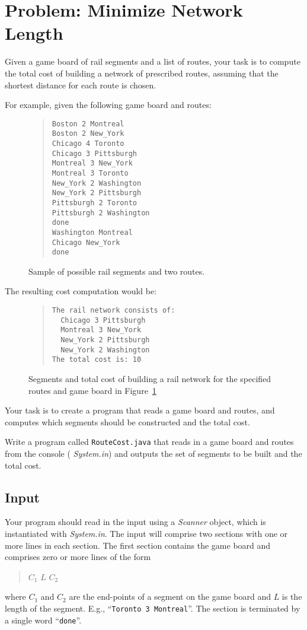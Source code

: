 \documentclass[12pt,pdftex]{article}
\begin{document}
\section*{Problem: Minimize Network Length}
Given a game board of rail segments and a list of routes, your task
is to compute the total cost of building a network of prescribed
routes, assuming that the shortest distance for each route is chosen.

For example, given the following game board and routes:
\begin{figure}[h]
\begin{quote}
\begin{verbatim}
Boston 2 Montreal
Boston 2 New_York
Chicago 4 Toronto
Chicago 3 Pittsburgh
Montreal 3 New_York
Montreal 3 Toronto
New_York 2 Washington
New_York 2 Pittsburgh
Pittsburgh 2 Toronto
Pittsburgh 2 Washington
done
Washington Montreal
Chicago New_York
done
\end{verbatim}
\end{quote}
\caption{Sample of possible rail segments and two routes.  \label{fig:input}}
\end{figure}

The resulting cost computation would be:
\begin{figure}[h]
\begin{quote}
\begin{verbatim}
The rail network consists of:
  Chicago 3 Pittsburgh
  Montreal 3 New_York
  New_York 2 Pittsburgh
  New_York 2 Washington
The total cost is: 10
\end{verbatim}
\end{quote}
\caption{Segments and total cost of building a rail network for the specified
         routes and game board in Figure~\ref{fig:input} \label{fig:output}}
\end{figure}


Your task is to create a program that reads a game board and routes,
and computes which segments should be constructed and the total cost.

Write a program called {\tt RouteCost.java} that reads in a
game board and routes from the console ({\it
System.in}) and outputs the set of segments to be built and 
the total cost.

\subsection*{Input}
Your program should read in the input using a {\it Scanner} object,
which is instantiated with {\it System.in}.  The input will comprise
two sections with one or more lines in each section.   The first
section contains the game board and comprises zero or more lines
of the form
\begin{quote}
$C_1$ $L$ $C_2$
\end{quote}
where $C_1$ and $C_2$ are the end-points of a segment on the game board and
$L$ is the length of the segment.  E.g., ``{\tt Toronto 3 Montreal}''.  The 
section is terminated by a single word ``{\tt done}''.
\end{document}
